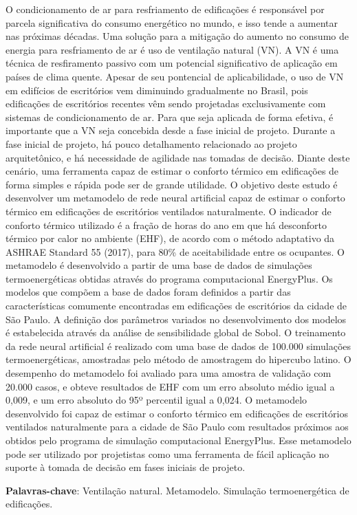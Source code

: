 
\setlength{\absparsep}{18pt} %
\begin{resumo}
	\SingleSpacing
	O condicionamento de ar para resfriamento de edificações é responsável por parcela significativa do consumo energético no mundo, e isso tende a aumentar nas próximas décadas. Uma solução para a mitigação do aumento no consumo de energia para resfriamento de ar é uso de ventilação natural (VN). 
	A VN é uma técnica de resfiramento passivo com um potencial significativo de aplicação em países de clima quente. 
	Apesar de seu pontencial de aplicabilidade, o uso de VN em edifícios de escritórios
	vem diminuindo gradualmente no Brasil, pois edificações de escritórios recentes vêm sendo projetadas exclusivamente com sistemas de condicionamento de ar.	
	Para que seja aplicada de forma efetiva, é importante que a VN seja concebida desde a fase inicial de projeto. Durante a fase inicial de projeto, há pouco detalhamento relacionado ao projeto arquitetônico, e há necessidade de agilidade nas tomadas de decisão.
	Diante deste cenário, uma ferramenta capaz de estimar o conforto térmico em edificações de forma simples e rápida pode ser de grande utilidade.	
	O objetivo deste estudo é desenvolver um metamodelo de rede neural artificial capaz de estimar o conforto térmico em edificações de escritórios ventilados naturalmente. 
	O indicador de conforto térmico utilizado é a fração de horas do ano em que há desconforto térmico por calor no ambiente (EHF), de acordo com o método adaptativo da ASHRAE Standard 55 (2017), para 80\% de aceitabilidade entre os ocupantes.	
	O metamodelo é desenvolvido a partir de uma base de dados de simulações termoenergéticas obtidas através do programa computacional EnergyPlus. Os modelos que compõem a base de dados foram definidos a partir das características comumente encontradas em edificações de escritórios da cidade de São Paulo. A definição dos parâmetros variados no desenvolvimento dos modelos é estabelecida através da análise de sensibilidade global de Sobol.	
	O treinamento da rede neural artificial é realizado com uma base de dados de 100.000 simulações termoenergéticas, amostradas pelo método de amostragem do hipercubo latino. 
	O desempenho do metamodelo foi avaliado para uma amostra de validação com 20.000 casos, e obteve resultados de EHF com um erro absoluto médio igual a 0,009, e um erro absoluto do 95º percentil igual a 0,024.	
	O metamodelo desenvolvido foi capaz de estimar o conforto térmico em edificações de escritórios ventilados naturalmente para a cidade de São Paulo com resultados próximos aos obtidos pelo programa de simulação computacional EnergyPlus.
	Esse metamodelo pode ser utilizado por projetistas como uma ferramenta de fácil aplicação no suporte à tomada de decisão em fases iniciais de projeto.
	
	\textbf{Palavras-chave}: Ventilação natural. Metamodelo. Simulação termoenergética de edificações.
\end{resumo}

